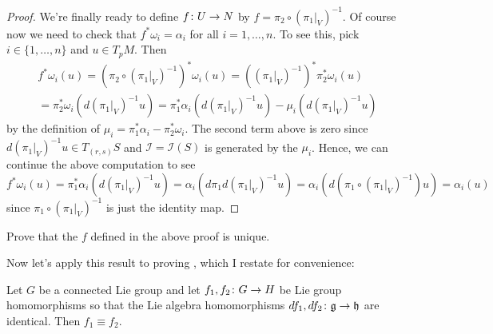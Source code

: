 \begin{proof}
	We're finally ready to define $f \colon\thinspace\! U \to N$ by $f = \pi_2 \circ \left(\left. \pi_1\right|_V\right)^{-1}$. Of course now we need to check that $f^\ast \omega_i = \alpha_i$ for all $i=1, \dots , n$. To see this, pick $i \in \{1, \dots , n\}$ and $u \in T_pM$. Then
	\begin{multline*}
		f^\ast \omega_i(u) = \left(\pi_2 \circ \left( \left. \pi_1 \right|_V\right)^{-1}\right)^\ast \omega_i(u) = \left(\left(\left. \pi_1\right|_V \right)^{-1}\right)^\ast \pi_2^\ast \omega_i(u) \\
		= \pi_2^\ast \omega_i\left(d\left(\left. \pi_1 \right|_V\right)^{-1} u \right) = \pi_1^\ast \alpha_i\left( d\left(\left. \pi_1 \right|_V\right)^{-1} u \right) - \mu_i \left(d\left(\left. \pi_1 \right|_V\right)^{-1} u  \right)
	\end{multline*}
	by the definition of $\mu_i = \pi_1^\ast \alpha_i - \pi_2^\ast \omega_i$. The second term above is zero since $d\left(\left. \pi_1 \right|_V\right)^{-1} u \in T_{(r,s)}S$ and $\mathcal{I} = \mathcal{I}(S)$ is generated by the $\mu_i$. Hence, we can continue the above computation to see
	\[
		f^\ast \omega_i(u) = \pi_1^\ast \alpha_i\left( d\left(\left. \pi_1 \right|_V\right)^{-1} u \right)  = \alpha_i \left(d \pi_1 d \left(\left. \pi_1 \right|_V\right)^{-1} u \right) = \alpha_i \left( d\left( \pi_1 \circ \left(\left. \pi_1 \right|_V\right)^{-1}\right)u\right) = \alpha_i(u)
	\]
	since $\pi_1 \circ \left(\left. \pi_1 \right|_V\right)^{-1}$ is just the identity map.
\end{proof}

\begin{exercise}
	Prove that the $f$ defined in the above proof is unique.
\end{exercise}

Now let's apply this result to proving , which I restate for convenience:

\begin{theorem*}
	Let $G$ be a connected Lie group and let $f_1, f_2 \colon\thinspace\! G \to H$ be Lie group homomorphisms so that the Lie algebra homomorphisms $df_1, df_2 \colon\thinspace\! \mathfrak{g} \to \mathfrak{h}$ are identical. Then $f_1 \equiv f_2$.
\end{theorem*}

